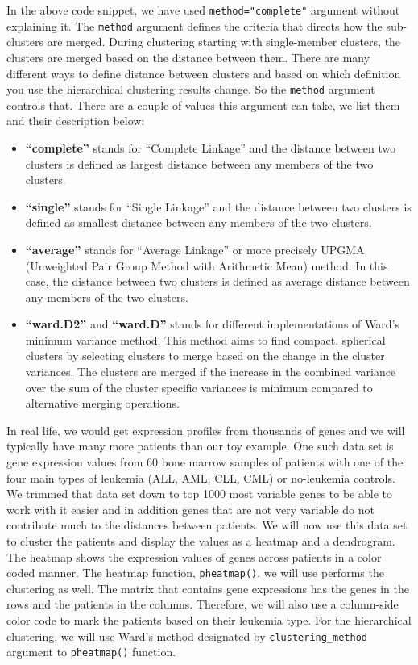 \documentclass[12pt,]{krantz}
\providecommand{\tightlist}{%
  \setlength{\itemsep}{0pt}\setlength{\parskip}{0pt}}
\theoremstyle{definition}
\theoremstyle{definition}
\theoremstyle{definition}
\theoremstyle{remark}
\begin{document}
In the above code snippet, we have used \texttt{method="complete"}
argument without explaining it. The \texttt{method} argument defines the
criteria that directs how the sub-clusters are merged. During clustering
starting with single-member clusters, the clusters are merged based on
the distance between them. There are many different ways to define
distance between clusters and based on which definition you use the
hierarchical clustering results change. So the \texttt{method} argument
controls that. There are a couple of values this argument can take, we
list them and their description below:

\begin{itemize}
\tightlist
\item
  \textbf{``complete''} stands for ``Complete Linkage'' and the distance
  between two clusters is defined as largest distance between any
  members of the two clusters.
\item
  \textbf{``single''} stands for ``Single Linkage'' and the distance
  between two clusters is defined as smallest distance between any
  members of the two clusters.
\item
  \textbf{``average''} stands for ``Average Linkage'' or more precisely
  UPGMA (Unweighted Pair Group Method with Arithmetic Mean) method. In
  this case, the distance between two clusters is defined as average
  distance between any members of the two clusters.
\item
  \textbf{``ward.D2''} and \textbf{``ward.D''} stands for different
  implementations of Ward's minimum variance method. This method aims to
  find compact, spherical clusters by selecting clusters to merge based
  on the change in the cluster variances. The clusters are merged if the
  increase in the combined variance over the sum of the cluster specific
  variances is minimum compared to alternative merging operations.
\end{itemize}

In real life, we would get expression profiles from thousands of genes
and we will typically have many more patients than our toy example. One
such data set is gene expression values from 60 bone marrow samples of
patients with one of the four main types of leukemia (ALL, AML, CLL,
CML) or no-leukemia controls. We trimmed that data set down to top 1000
most variable genes to be able to work with it easier and in addition
genes that are not very variable do not contribute much to the distances
between patients. We will now use this data set to cluster the patients
and display the values as a heatmap and a dendrogram. The heatmap shows
the expression values of genes across patients in a color coded manner.
The heatmap function, \texttt{pheatmap()}, we will use performs the
clustering as well. The matrix that contains gene expressions has the
genes in the rows and the patients in the columns. Therefore, we will
also use a column-side color code to mark the patients based on their
leukemia type. For the hierarchical clustering, we will use Ward's
method designated by \texttt{clustering\_method} argument to
\texttt{pheatmap()} function.
\end{document}

